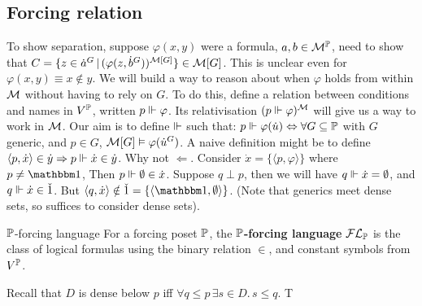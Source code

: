 \documentclass{article}
\begin{document}
    \subsection{Forcing relation}
    To show separation, suppose $\varphi(x,y)$ were a formula, $a,b \in \mathcal{M}^{\mathbb{P}}$, need to show that $C = \{ z \in \dot{a}^{G} \, | \, (\varphi(z,\dot{b}^{G}))^{\mathcal{M}[G]}\} \in \mathcal{M}[G]$. This is unclear even for $\varphi(x,y) \equiv x \notin y$. We will build a way to reason about when $\varphi$ holds from within $\mathcal{M}$ without having to rely on $G$. \gap
    To do this, define a relation between conditions and names in $V^{\mathbb{P}}$, written $p \Vdash \varphi$. Its relativisation $(p \Vdash \varphi)^{\mathcal{M}}$ will give us a way to work in $\mathcal{M}$.\gap
    Our aim is to define $\Vdash$ such that: $ p \Vdash \varphi(\dot{u}) \Leftrightarrow \forall G \subseteq \mathbb{P}$ with $G$ generic, and $p \in G$, $\mathcal{M}[G] \vDash \varphi(\dot{u}^{G})$.
    A naive definition might be to define $\langle p, \dot{x} \rangle \in \dot{y} \Rightarrow p \Vdash \dot{x} \in \dot{y}$.
    Why not $\Leftarrow$. Consider $\dot{x} = \{\langle p ,\varphi
\rangle \}$ where $p \neq \bbone$, Then $p \Vdash \emptyset \in \dot{x}$. Suppose $q \perp p$, then we will have $q \Vdash \dot{x} = \emptyset$, and $q \Vdash \dot{x} \in \check{1}$. But $\langle q, \dot{x} \rangle \notin \check{1} = \{ \langle \bbone, \emptyset \rangle \}$. (Note that generics meet dense sets, so suffices to consider dense sets).
    \begin{fancydefine}{$\mathbb{P}$-forcing language}
        For a forcing poset $\mathbb{P}$, the $\mathbb{P}$\textbf{-forcing language} $\mathcal{F} \mathcal{L}_{\mathbb{P}}$ is the class of logical formulas using the binary relation $\in$, and constant symbols from $V^{\mathbb{P}}$.
    \end{fancydefine}
    Recall that $D$ is dense below $p$ iff $\forall q \leq p \, \exists s \in D. \, s \leq q$. T
\end{document}
